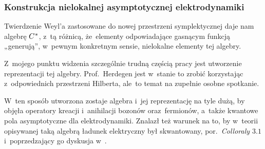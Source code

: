 \documentclass[10pt,t]{beamer}
\begin{document}
\begin{frame}
  \frametitle{Konstrukcja nielokalnej asymptotycznej
    elektrodynamiki}


  Twierdzenie Weyl’a zastosowane do nowej przestrzeni symplektycznej daje
  nam algebrę $C^{ \hspace{0.05em} * }$, z~tą różnicą, że~elementy
  odpowiadające gasnącym funkcją „generują”, w~pewnym konkretnym sensie,
  \alert{nielokalne} elementy tej algebry.

  Z~mojego punktu widzenia szczególnie trudną częścią pracy jest utworzenie
  reprezentacji tej algebry. Prof.~Herdegen jest w~stanie to zrobić
  korzystając z~odpowiednich
  przestrzeni Hilberta, ale~to temat na zupełnie osobne spotkanie.

  W~ten sposób utworzona zostaje algebra i~jej reprezentację
  na tyle dużą, by objęła operatory kreacji i~anihilacji bozonów
  oraz~fermionów, a~także \alert{kwantowe} pola asymptotyczne
  dla elektrodynamiki. Znalazł też warunek na to, by w~teorii opisywanej
  taką algebrą ładunek elektryczny był skwantowany,
  por.~\textit{Colloraly $3.1$} i~poprzedzający go dyskusja
  w~\parencite{Herdegen-Semidirect-product-of-CCR-and-CAR-algebras-ETC-Pub-1998}.


\end{frame}
\end{document}
